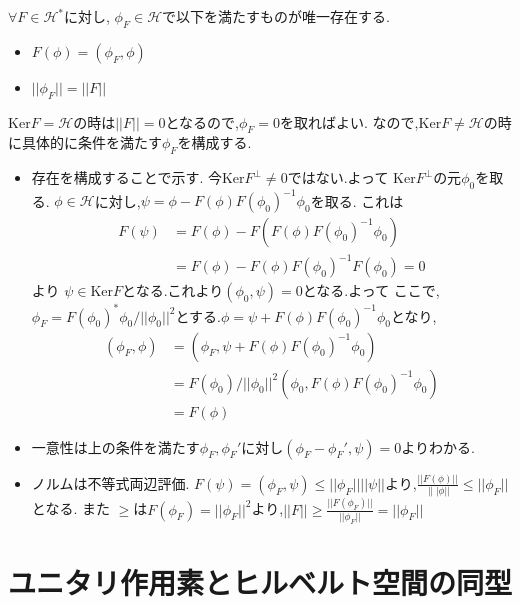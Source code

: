 \documentclass[uplatex]{jsbook}
\begin{document}
\begin{thm}[リースの表現定理]
$\forall F \in \mathcal{H}^*$に対し, $\phi_F \in \mathcal{H}$で以下を満たすものが唯一存在する.
\begin{itemize}
  \item $F(\phi) = (\phi_F, \phi)$
  \item $||\phi_F|| = ||F||$
\end{itemize}
\end{thm}
$\mathrm{Ker}F = \mathcal{H}$の時は$||F|| = 0$となるので,$\phi_F= 0$を取ればよい.
なので,$\mathrm{Ker}F \neq \mathcal{H}$の時に具体的に条件を満たす$\phi_F$を構成する.
\begin{itemize}
  \item 存在を構成することで示す.
  今$\mathrm{Ker} F^{\perp} \neq {0}$ではない.よって
  $\mathrm{Ker}F^{\perp}$の元$\phi_0$を取る. $\phi \in \mathcal{H}$に対し,$\psi = \phi - F(\phi)F(\phi_0)^{-1}\phi_0 $を取る.
  これは
  \begin{align*}
  F(\psi) & =  F(\phi) - F(F(\phi) F(\phi_0)^{-1}\phi_0)  \\
          & =  F(\phi) - F(\phi)F(\phi_0)^{-1}F(\phi_0)  = 0
  \end{align*}
  より $\psi \in \mathrm{Ker}F$となる.これより$(\phi_0, \psi) =0$となる.よって
  ここで,$\phi_F = F(\phi_0)^* \phi_0 / || \phi_0||^2$とする.$\phi = \psi + F(\phi)F(\phi_0)^{-1} \phi_0$となり,
  \begin{align*}
  (\phi_F, \phi) & = (\phi_F, \psi + F(\phi)F(\phi_0)^{-1} \phi_0)  \\
                 & = F(\phi_0) / || \phi_0||^2 (\phi_0,  F(\phi)F(\phi_0)^{-1} \phi_0) \\
                 & =  F(\phi)
  \end{align*}
 \item 一意性は上の条件を満たす$\phi_F, \phi_F'$に対し$(\phi_F - \phi_F' , \psi) = 0$よりわかる.
 \item  ノルムは不等式両辺評価.
 $F(\psi) = (\phi_F, \psi) \le ||\phi_F|| ||\psi||$より,$\frac{||F(\phi)||}{\||\phi||} \le ||\phi_F||$となる.
 また
 $\ge$は$F(\phi_F) = ||\phi_F||^2$より,$||F|| \ge \frac{||F(\phi_F)||}{||\phi_F||} = ||\phi_F||$
\end{itemize}

\section{ユニタリ作用素とヒルベルト空間の同型}
\end{document}
